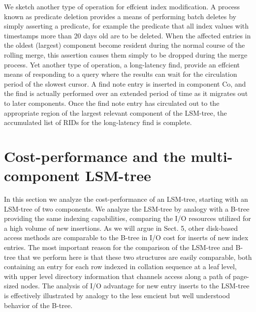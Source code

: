 \documentclass[a4paper,11pt,notitlepage,twoside,openright]{article}
\begin{document}
We sketch another type of operation for effcient index modification. A
process known as predicate deletion provides a means of performing batch
deletes by simply asserting a predicate, for example the predicate that
all index values with timestamps more than 20 days old are to be
deleted. When the affected entries in the oldest (largest) component
become resident during the normal course of the rolling merge, this
assertion causes them simply to be dropped during the merge process. Yet
another type of operation, a long-latency find, provide an effcient
means of responding to a query where the results can wait for the
circulation period of the slowest cursor. A find note entry is inserted
in component Co, and the find is actually performed over an extended
period of time as it migrates out to later components. Once the find
note entry has circulated out to the appropriate region of the largest
relevant component of the LSM-tree, the accumulated list of RIDs for the
long-latency find is complete.


\hypertarget{cost-performance-and-the-multi-component-lsm-tree}{%
\section{Cost-performance and the multi-component
LSM-tree}\label{cost-performance-and-the-multi-component-lsm-tree}}


In this section we analyze the cost-performance of an LSM-tree, starting
with an LSM-tree of two components. We analyze the LSM-tree by analogy
with a B-tree providing the same indexing capabilities, comparing the
I/O resources utilized for a high volume of new insertions. As we will
argue in Sect. 5, other disk-based access methods are comparable to the
B-tree in I/O cost for inserts of new index entries. The most important
reason for the comparison of the LSM-tree and B-tree that we perform
here is that these two structures are easily comparable, both containing
an entry for each row indexed in collation sequence at a leaf level,
with upper level directory information that channels access along a path
of page-sized nodes. The analysis of I/O advantage for new entry inserts
to the LSM-tree is effectively illustrated by analogy to the less
emcient but well understood behavior of the B-tree.
\end{document}

